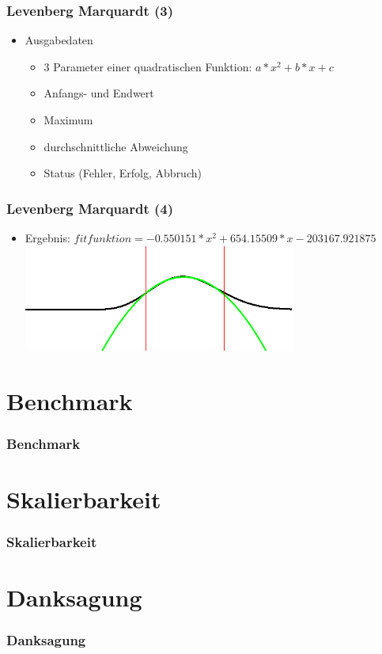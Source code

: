 \documentclass[ddcfooter]{tudbeamer}
\begin{document}
\begin{frame}
    \frametitle*{Levenberg Marquardt (3)}
	\begin{itemize}
        \item{Ausgabedaten}
        	\begin{itemize}
        		\item{3 Parameter einer quadratischen Funktion: $a*x^2+b*x+c$}
        		\item{Anfangs- und Endwert}
        		\item{Maximum}
        		\item{durchschnittliche Abweichung}
        		\item{Status (Fehler, Erfolg, Abbruch)}
        		
        	\end{itemize}
    \end{itemize}
\end{frame}
\begin{frame}
    \frametitle*{Levenberg Marquardt (4)}
	\begin{itemize}
        \item{Ergebnis: $fitfunktion=-0.550151*x^2+654.15509*x-203167.921875$}
        \includegraphics[height=3.5cm]{Beispielergebnis.png}
    \end{itemize}
\end{frame}
\section{Benchmark}
\begin{frame}
    \frametitle*{Benchmark}
    
\end{frame}
\section{Skalierbarkeit}
\begin{frame}
    \frametitle*{Skalierbarkeit}

\end{frame}
\section{Danksagung}

\begin{frame}
    \frametitle*{Danksagung}
    
\end{frame}
\end{document}
